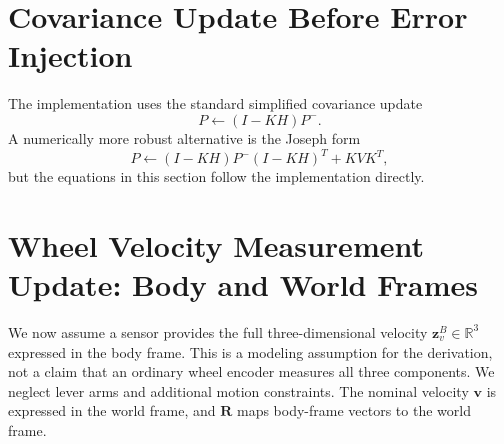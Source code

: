 \documentclass[11pt]{article}
\newcommand{\R}{\mathbf{R}}
\newcommand{\vct}{\mathbf{v}}
\begin{document}
\section{Covariance Update Before Error Injection}
The implementation uses the standard simplified covariance update
\begin{equation}
\boxed{
P \leftarrow (I-KH)P^{-}.
}
\end{equation}
A numerically more robust alternative is the Joseph form
\begin{equation}
P \leftarrow
(I-KH)P^{-}(I-KH)^{T}
+KVK^{T},
\end{equation}
but the equations in this section follow the implementation directly.

\section{Wheel Velocity Measurement Update: Body and World Frames}
We now assume a sensor provides the full three-dimensional velocity
$\bm z_v^B\in\mathbb R^3$ expressed in the body frame. This is a modeling
assumption for the derivation, not a claim that an ordinary wheel encoder
measures all three components. We neglect lever arms and additional motion
constraints. The nominal velocity $\vct$ is expressed in the world frame,
and $\R$ maps body-frame vectors to the world frame.
\end{document}
